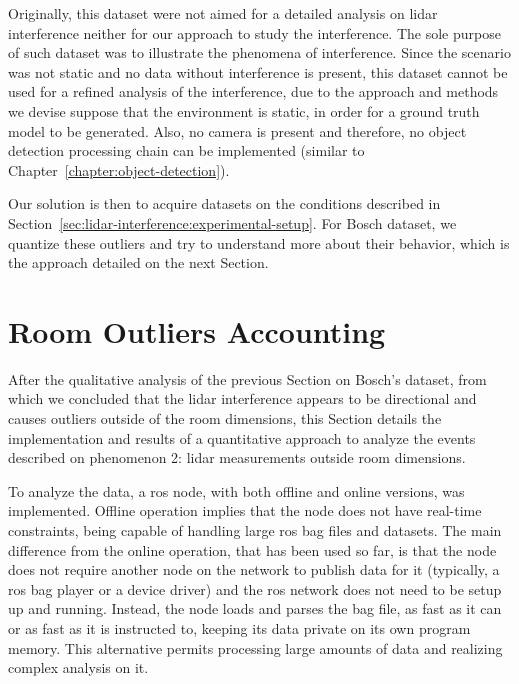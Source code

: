 Originally, this dataset were not aimed for a detailed analysis on \ac{lidar} interference neither for our approach to study the interference. The sole purpose of such dataset was to illustrate the phenomena of interference. Since the scenario was not static and no data without interference is present, this dataset cannot be used for a refined analysis of the interference, due to the approach and methods we devise suppose that the environment is static, in order for a ground truth model to be generated. Also, no camera is present and therefore, no object detection processing chain can be implemented (similar to Chapter~\ref{chapter:object-detection}). 

Our solution is then to acquire datasets on the conditions described in Section~\ref{sec:lidar-interference:experimental-setup}. For Bosch dataset, we quantize these outliers and try to understand more about their behavior, which is the approach detailed on the next Section.




\section{Room Outliers Accounting}
\label{sec:lidar-interference:room-outliers}
After the qualitative analysis of the previous Section on Bosch's dataset, from which we concluded that the \ac{lidar} interference appears to be directional and causes outliers outside of the room dimensions, this Section details the implementation and results of a quantitative approach to analyze the events described on phenomenon 2: \ac{lidar} measurements outside room dimensions.

To analyze the data, a \ac{ros} node, with both offline and online versions, was implemented. Offline operation implies that the node does not have real-time constraints, being capable of handling large \ac{ros} bag files and datasets. The main difference from the online operation, that has been used so far, is that the node does not require another node on the network to publish data for it (typically, a \ac{ros} bag player or a device driver) and the \ac{ros} network does not need to be setup up and running. Instead, the node loads and parses the bag file, as fast as it can or as fast as it is instructed to, keeping its data private on its own program memory. This alternative permits processing large amounts of data and realizing complex analysis on it.

